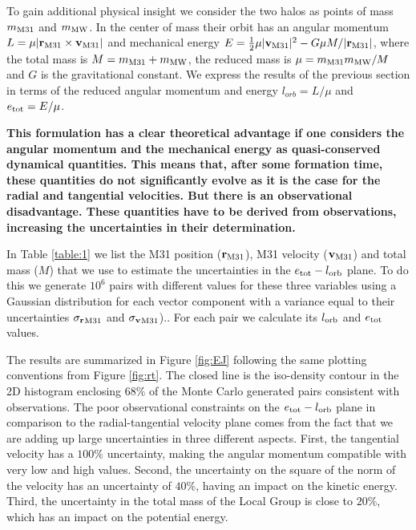 \documentclass{emulateapj}
\begin{document}
To gain additional physical insight we consider the two halos as points of mass $m_{\rm M31}$ and $m_{\rm MW}$. In the center of mass their orbit has an angular momentum $L=\mu|{{\bf r}_{\rm M31}}\times{\bf v}_{\rm M31}|$ and mechanical energy $E=\frac{1}{2}\mu |{\bf v}_{\rm M31}|^2 - G\mu M/|{\bf r}_{\rm M31}|$, where the total mass is $M=m_{\rm M31}+m_{\rm MW}$, the reduced mass is $\mu=m_{\rm M31}m_{\rm MW}/M$ and $G$ is the gravitational constant. We express the results of the previous section in terms of the reduced angular momentum and energy $l_{orb}=L/\mu$ and $e_{\rm tot}=E/\mu$. 

{\bf This formulation has a clear theoretical advantage if one considers the angular momentum and the mechanical energy as quasi-conserved dynamical quantities. This means that, after some formation time, these quantities do not significantly evolve as it is the case for the radial and tangential velocities. But there is an observational disadvantage. These quantities have to be derived from observations, increasing the uncertainties in their determination.}

In Table \ref{table:1} we list the M31 position (${\bf r}_{\rm M31}$), M31 velocity (${\bf v}_{\rm M31}$) and total mass ($M$) that we use to estimate the uncertainties in the $e_{\rm tot}-l_{\rm orb}$ plane. To do this we generate $10^6$ pairs with different values for these three variables using a Gaussian distribution for each vector component with a variance equal to their uncertainties ${\sigma_{\bf r}}_{\rm M31}$ and ${\sigma_{\bf v}}_{\rm M31}$).. For each pair we calculate its $l_{\rm orb}$ and $e_{\rm tot}$ values.  

The results are summarized in Figure \ref{fig:EJ} following the same plotting conventions from Figure \ref{fig:rt}. The closed line is the iso-density contour in the 2D histogram enclosing $68\%$ of the Monte Carlo generated pairs consistent with observations. The poor observational constraints on the $e_{\rm tot}-l_{\rm orb}$ plane in comparison to the radial-tangential velocity plane comes from the fact that we are adding up large uncertainties in three different aspects. First, the tangential velocity has a $100\%$ uncertainty, making the angular momentum compatible with very low and high values. Second, the uncertainty on the square of the norm of the velocity has an uncertainty of $40\%$, having an impact on the kinetic energy. Third, the uncertainty in the total mass of the Local Group is close to $20\%$, which has an impact on the potential energy. 
\end{document}
